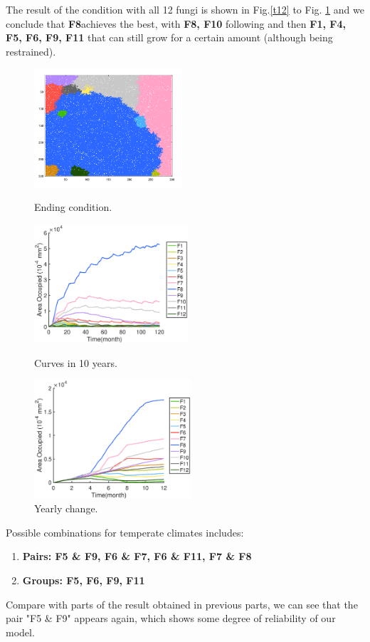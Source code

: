 \documentclass[a4paper,12pt]{article}
\begin{document}
The result of the condition with all 12 fungi is shown in Fig.\ref{t12} to Fig. \ref{yt12} and we conclude that \textbf{F8}achieves the best, with \textbf{F8, F10} following and then \textbf{F1, F4, F5, F6, F9, F11} that can still grow for a certain amount (although being restrained).
\begin{figure}[H]
	\begin{minipage}{29ex}
	\includegraphics[height=4.4cm]{./formal/temperate/12[1].png}
	\caption{Ending condition.}
	\label{t12}
\end{minipage}   
\begin{minipage}{31ex}
	\includegraphics[height=4.4cm]{./formal/temperate/12[2].eps}
	\caption{Curves in 10 years.}
	\label{t}
\end{minipage}
\begin{minipage}{29ex}
 \quad
	\includegraphics[height=4.4cm]{./formal/temperate/12[3].eps}
	\caption{Yearly change.}
	\label{yt12}
\end{minipage} 
\end{figure}

Possible combinations for temperate climates includes:
\begin{enumerate}
\setlength{\itemsep}{0ex} %
\item \textbf{Pairs: F5 \& F9, F6 \& F7, F6 \& F11, F7 \& F8}
\item \textbf{Groups: F5, F6, F9, F11 }
\end{enumerate} Compare with parts of the result obtained in previous parts, we can see that the pair "F5 \& F9" appears again, which shows some degree of reliability of our model.
\end{document}
